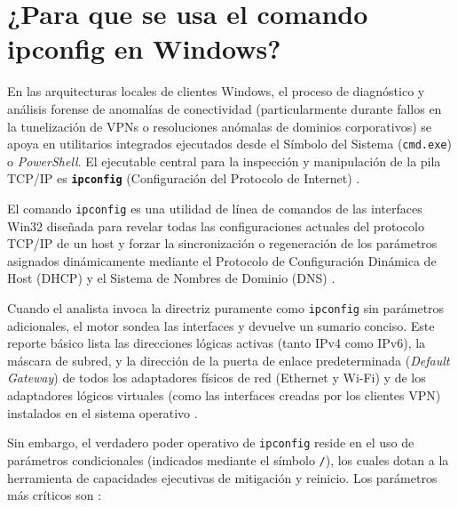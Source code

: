 \documentclass[a4paper,12pt]{article}
\begin{document}
\newpage
\section{¿Para que se usa el comando ipconfig en Windows?}

En las arquitecturas locales de clientes Windows, el proceso de diagnóstico y análisis forense de anomalías de conectividad (particularmente durante fallos en la tunelización de VPNs o resoluciones anómalas de dominios corporativos) se apoya en utilitarios integrados ejecutados desde el Símbolo del Sistema (\texttt{cmd.exe}) o \textit{PowerShell}. El ejecutable central para la inspección y manipulación de la pila TCP/IP es \textbf{\texttt{ipconfig}} (Configuración del Protocolo de Internet) \cite{ms_learn_ipconfig, ionos_ipconfig}.

El comando \texttt{ipconfig} es una utilidad de línea de comandos de las interfaces Win32 diseñada para revelar todas las configuraciones actuales del protocolo TCP/IP de un host y forzar la sincronización o regeneración de los parámetros asignados dinámicamente mediante el Protocolo de Configuración Dinámica de Host (DHCP) y el Sistema de Nombres de Dominio (DNS) \cite{ms_learn_ipconfig}. 

Cuando el analista invoca la directriz puramente como \texttt{ipconfig} sin parámetros adicionales, el motor sondea las interfaces y devuelve un sumario conciso. Este reporte básico lista las direcciones lógicas activas (tanto IPv4 como IPv6), la máscara de subred, y la dirección de la puerta de enlace predeterminada (\textit{Default Gateway}) de todos los adaptadores físicos de red (Ethernet y Wi-Fi) y de los adaptadores lógicos virtuales (como las interfaces creadas por los clientes VPN) instalados en el sistema operativo \cite{ms_learn_ipconfig, ionos_ipconfig}. 

Sin embargo, el verdadero poder operativo de \texttt{ipconfig} reside en el uso de parámetros condicionales (indicados mediante el símbolo \texttt{/}), los cuales dotan a la herramienta de capacidades ejecutivas de mitigación y reinicio. Los parámetros más críticos son \cite{ms_learn_ipconfig, ms_learn_ipconfig_renew}:
\end{document}
